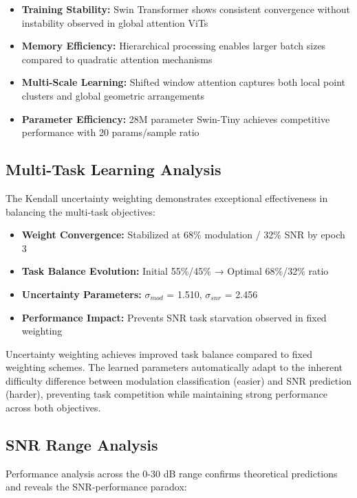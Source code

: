 \documentclass{ELSP}
\begin{document}
{{\begin{itemize}
    \item \textbf{Training Stability:} Swin Transformer shows consistent convergence without instability observed in global attention ViTs
    \item \textbf{Memory Efficiency:} Hierarchical processing enables larger batch sizes compared to quadratic attention mechanisms  
    \item \textbf{Multi-Scale Learning:} Shifted window attention captures both local point clusters and global geometric arrangements
    \item \textbf{Parameter Efficiency:} 28M parameter Swin-Tiny achieves competitive performance with 20 params/sample ratio
\end{itemize}

\subsection{Multi-Task Learning Analysis}

The Kendall uncertainty weighting demonstrates exceptional effectiveness in balancing the multi-task objectives:

\begin{itemize}
    \item \textbf{Weight Convergence:} Stabilized at 68\% modulation / 32\% SNR by epoch 3
    \item \textbf{Task Balance Evolution:} Initial 55\%/45\% → Optimal 68\%/32\% ratio
    \item \textbf{Uncertainty Parameters:} $\sigma_{mod}$ = 1.510, $\sigma_{snr}$ = 2.456
    \item \textbf{Performance Impact:} Prevents SNR task starvation observed in fixed weighting
\end{itemize}

Uncertainty weighting achieves improved task balance compared to fixed weighting schemes. The learned parameters automatically adapt to the inherent difficulty difference between modulation classification (easier) and SNR prediction (harder), preventing task competition while maintaining strong performance across both objectives.

\subsection{SNR Range Analysis}

Performance analysis across the 0-30 dB range confirms theoretical predictions and reveals the SNR-performance paradox:

}}
\end{document}
